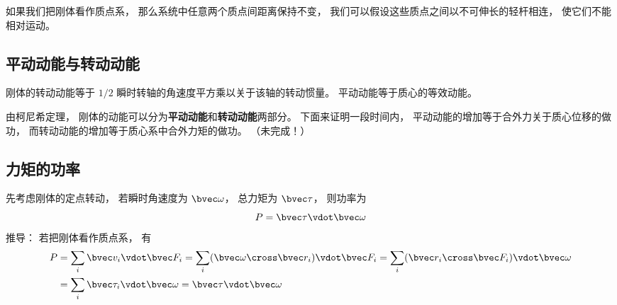 
\begin{issues}
\issueDraft
\end{issues}


如果我们把刚体看作质点系， 那么系统中任意两个质点间距离保持不变， 我们可以假设这些质点之间以不可伸长的轻杆相连， 使它们不能相对运动。

\subsection{平动动能与转动动能}

刚体的转动动能等于 $1/2$ 瞬时转轴的角速度平方乘以关于该轴的转动惯量。 平动动能等于质心的等效动能。

由柯尼希定理， 刚体的动能可以分为\textbf{平动动能}和\textbf{转动动能}两部分。 下面来证明一段时间内， 平动动能的增加等于合外力关于质心位移的做功， 而转动动能的增加等于质心系中合外力矩的做功。
（未完成！）

\subsection{力矩的功率}
先考虑刚体的定点转动， 若瞬时角速度为 $\bvec \omega$， 总力矩为 $\bvec \tau$， 则功率为
\begin{equation}
P = \bvec \tau\vdot \bvec \omega
\end{equation}
推导： 若把刚体看作质点系， 有
\begin{equation}
\begin{aligned}
P &= \sum_i \bvec v_i \vdot \bvec F_i
= \sum_i (\bvec \omega \cross \bvec r_i) \vdot \bvec F_i
= \sum_i (\bvec r_i\cross\bvec F_i)\vdot \bvec \omega\\
&= \sum_i \bvec \tau_i \vdot \bvec \omega = \bvec \tau\vdot \bvec \omega
\end{aligned}
\end{equation}



